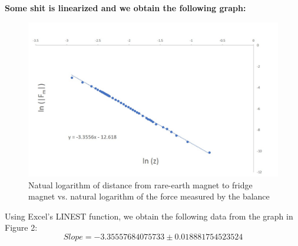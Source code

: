 \documentclass[letterpaper]{article}
\begin{document}
\textbf{Some shit is linearized and we obtain the following graph:}
\begin{figure}[H]
 \centering
 \includegraphics[width=\textwidth]{ferromagnet.jpg}
 \caption{Natual logarithm of distance from rare-earth magnet to fridge magnet vs. natural logarithm of the force measured by the balance }
\end{figure}

\noindent Using Excel's LINEST function, we obtain the following data from the graph in Figure 2:
$$Slope =-3.35557684075733 \pm 0.018881754523524 $$
\end{document}
